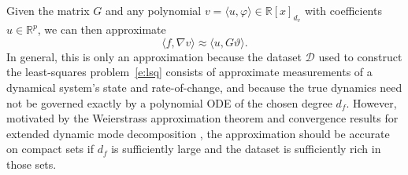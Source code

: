 \documentclass[11pt]{amsart}
\numberwithin{equation}{section}
\theoremstyle{plain}
\theoremstyle{definition}
\theoremstyle{remark}
\newcommand{\R}{\mathbb{R}}
\renewcommand{\vec}[1]{{#1}}
\newcommand{\mat}[1]{{#1}}
\newcommand{\ip}[2]{\langle #1, #2 \rangle}
\begin{document}
Given the matrix $\mat{G}$ and any polynomial $v=\ip{\vec{u}}{\varphi} \in \R[x]_{d_v}$ with coefficients $\vec{u}\in\R^p$, we can then approximate
\begin{equation*}
    \ip{\vec{f}}{\nabla v} \approx \ip{\vec{u}}{\mat{G} \vartheta}.
\end{equation*}
In general, this is only an approximation because the dataset $\mathcal{D}$ used to construct the least-squares problem~\cref{e:lsq} consists of approximate measurements of a dynamical system's state and rate-of-change, and because the true dynamics need not be governed exactly by a polynomial ODE of the chosen degree $d_f$. However, motivated by the Weierstrass approximation theorem and convergence results for extended dynamic mode decomposition \cite{williams2015data,Bramburger2024,klus2020data,KordaMezic2018,Klus2016}, the approximation should be accurate on compact sets if $d_f$ is sufficiently large and the dataset is sufficiently rich in those sets.
\end{document}
